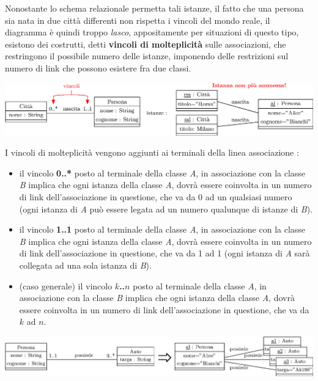 \documentclass[12pt, letterpaper]{article}
\begin{document}
Nonostante lo schema relazionale permetta tali istanze, il fatto che una persona sia nata in due città differenti 
non rispetta i vincoli del mondo reale, il diagramma è quindi troppo \textit{lasco}, appositamente per situazioni 
di questo tipo, esistono dei costrutti, detti \textbf{vincoli di molteplicità} sulle associazioni, che restringono 
il possibile numero delle istanze, imponendo delle restrizioni sul numero di link che possono esistere fra due classi.
\begin{center}
    \includegraphics[width=1\textwidth ]{images/molteplicita.eps}
\end{center} 
I vincoli di molteplicità vengono aggiunti ai terminali della linea associazione : \begin{itemize}
    \item il vincolo \textbf{0..*} posto al terminale della classe \textit{A}, in associazione con la 
    classe \textit{B} implica che ogni istanza della classe \textit{A}, dovrà essere coinvolta in un numero di link 
    dell'associazione in questione, che va da 0 ad un qualsiasi numero (ogni istanza di \textit{A} può essere legata 
    ad un numero qualunque di istanze di \textit{B}).
    \item il vincolo \textbf{1..1} posto al terminale della classe \textit{A}, in associazione con la 
    classe \textit{B} implica che ogni istanza della classe \textit{A}, dovrà essere coinvolta in un numero di link 
    dell'associazione in questione, che va da 1 ad 1 (ogni istanza di \textit{A} sarà collegata ad una sola 
    istanza di \textit{B}).
    \item (caso generale) il vincolo \textbf{\(k\)..\(n\)} posto al terminale della classe \textit{A}, in associazione con la 
    classe \textit{B} implica che ogni istanza della classe \textit{A}, dovrà essere coinvolta in un numero di link 
    dell'associazione in questione, che va da \(k\) ad \(n\).
\end{itemize}\begin{center}
    \includegraphics[width=\textwidth ]{images/esempioAuto.eps}
\end{center}
\end{document}
